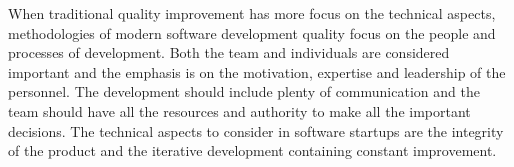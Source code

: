 When traditional quality improvement has more focus on the technical aspects, methodologies of modern software development quality focus on the people and processes of development. Both the team and individuals are considered important and the emphasis is on the motivation, expertise and leadership of the personnel. The development should include plenty of communication and the team should have all the resources and authority to make all the important decisions. The technical aspects to consider in software startups are the integrity of the product and the iterative development containing constant improvement.

